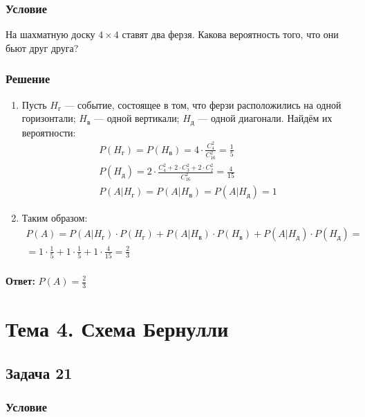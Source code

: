 \documentclass[14pt]{article}
\begin{document}
    \subsubsection*{Условие}

    На шахматную доску $4 \times 4$ ставят два ферзя.
    Какова вероятность того, что они бьют друг друга?

    \subsubsection*{Решение}

    \begin{enumerate}[wide, labelwidth=!, labelindent=0pt]
        \item Пусть $H_г$ --- событие, состоящее в том, что ферзи расположились на одной горизонтали; $H_в$ --- одной вертикали; $H_д$ --- одной диагонали.
        Найдём их вероятности:
        \begin{gather*}
            P(H_г) = P(H_в) = 4 \cdot \frac{C_4^2}{C_{16}^2} = \frac{1}{5}\\
            P(H_д) = 2 \cdot \frac{C_4^2 + 2 \cdot C_3^2 + 2 \cdot C_2^2}{C_{16}^2} = \frac{4}{15}\\
            P(A|H_г) = P(A|H_в) = P(A|H_д) = 1
        \end{gather*}
        \item Таким образом:
        \begin{gather*}
            P(A) = P(A|H_г) \cdot P(H_г) + P(A|H_в) \cdot P(H_в) + P(A|H_д) \cdot P(H_д) =\\
            = 1 \cdot \frac{1}{5} + 1 \cdot \frac{1}{5} + 1 \cdot \frac{4}{15} = \frac{2}{3}\\
        \end{gather*}
    \end{enumerate}
    \hspace{290pt}\textbf{Ответ:} $P(A) = \frac{2}{3}$

    \section*{Тема 4. Схема Бернулли}

    \subsection*{Задача 21}
    \subsubsection*{Условие}
\end{document}
